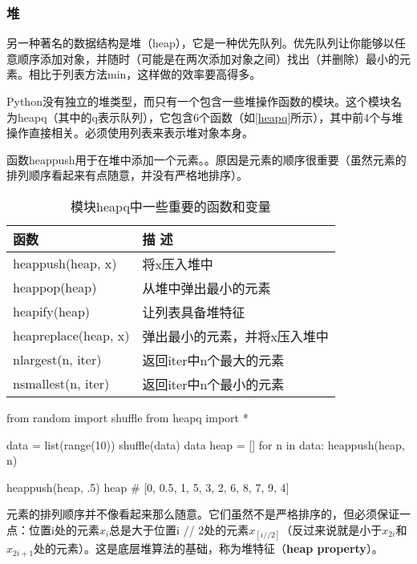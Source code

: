 \subsubsection{堆}

另一种著名的数据结构是堆（heap），它是一种优先队列。优先队列让你能够以任意顺序添加对象，并随时（可能是在两次添加对象之间）找出（并删除）最小的元素。相比于列表方法min，这样做的效率要高得多。

Python没有独立的堆类型，而只有一个包含一些堆操作函数的模块。这个模块名为heapq（其中的q表示队列），它包含6个函数（如\autoref{heapq}所示），其中前4个与堆操作直接相关。必须使用列表来表示堆对象本身。

函数heappush用于在堆中添加一个元素。。原因是元素的顺序很重要（虽然元素的排列顺序看起来有点随意，并没有严格地排序）。

\begin{table}
    \centering
    \caption{模块heapq中一些重要的函数和变量}
    \label{heapq}
    \begin{tabular}{ll}
        \hline
        函数                   & 描 述             \\
        \hline
        heappush(heap, x)    & 将x压入堆中          \\
        heappop(heap)        & 从堆中弹出最小的元素      \\
        heapify(heap)        & 让列表具备堆特征        \\
        heapreplace(heap, x) & 弹出最小的元素，并将x压入堆中 \\
        nlargest(n, iter)    & 返回iter中n个最大的元素  \\
        nsmallest(n, iter)   & 返回iter中n个最小的元素  \\
        \hline
    \end{tabular}
\end{table}

\begin{pyc}
from random import shuffle
from heapq import *

data = list(range(10))
shuffle(data)
data
heap = []
for n in data:
    heappush(heap, n)

heappush(heap, .5)
heap  # [0, 0.5, 1, 5, 3, 2, 6, 8, 7, 9, 4]
\end{pyc}

元素的排列顺序并不像看起来那么随意。它们虽然不是严格排序的，但必须保证一点：位置i处的元素$x_i$总是大于位置i // 2处的元素$x_{[i // 2]}$（反过来说就是小于$x_{2i}$和$x_{2i+1}$处的元素）。这是底层堆算法的基础，称为堆特征（\textbf{heap property}）。

